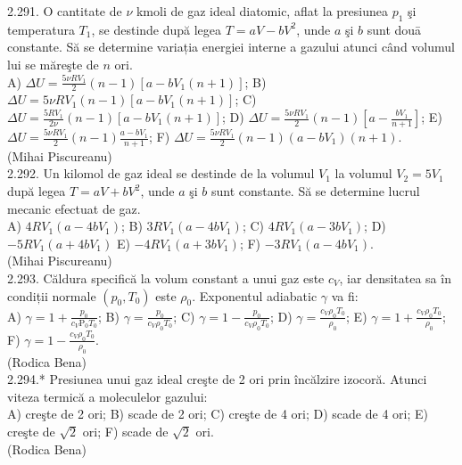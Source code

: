 2.291. O cantitate de $\nu$ kmoli de gaz ideal diatomic, aflat la presiunea $p_{1}$ şi temperatura $T_{1}$, se destinde după legea $T=a V-b V^{2}$, unde $a$ şi $b$ sunt douā constante. Să se determine variația energiei interne a gazului atunci când volumul lui se măreşte de $n$ ori.\\ A) $\Delta U=\frac{5 \nu R V_{1}}{2}(n-1)\left[a-b V_{1}(n+1)\right]$; B) $\Delta U=5 \nu R V_{1}(n-1)\left[a-b V_{1}(n+1)\right]$; C) $\Delta U=\frac{5 R V_{1}}{2 \nu}(n-1)\left[a-b V_{1}(n+1)\right]$; D) $\Delta U=\frac{5 \nu R V_{1}}{2}(n-1)\left[a-\frac{b V_{1}}{n+1}\right]$; E) $\Delta U=\frac{5 \nu R V_{1}}{2}(n-1) \frac{a-b V_{1}}{n+1}$; F) $\Delta U=\frac{5 \nu R V_{1}}{2}(n-1)\left(a-b V_{1}\right)(n+1)$.\\ (Mihai Piscureanu)\\

2.292. Un kilomol de gaz ideal se destinde de la volumul $V_{1}$ la volumul $V_{2}=5 V_{1}$ după legea $T=a V+b V^{2}$, unde $a$ şi $b$ sunt constante. Să se determine lucrul mecanic efectuat de gaz.\\ A) $4 R V_{1}\left(a-4 b V_{1}\right)$; B) $3 R V_{1}\left(a-4 b V_{1}\right)$; C) $4 R V_{1}\left(a-3 b V_{1}\right)$; D) $-5 R V_{1}\left(a+4 b V_{1}\right)$ E) $-4 R V_{1}\left(a+3 b V_{1}\right)$; F) $-3 R V_{1}\left(a-4 b V_{1}\right)$.\\ (Mihai Piscureanu)\\

2.293. Căldura specifică la volum constant a unui gaz este $c_{V}$, iar densitatea sa în condiții normale $\left(p_{0}, T_{0}\right)$ este $\rho_{0}$. Exponentul adiabatic $\gamma$ va fi:\\ A) $\gamma=1+\frac{p_{0}}{c_{V} \mathrm{P}_{0} T_{0}}$; B) $\gamma=\frac{p_{0}}{c_{V} \rho_{0} T_{0}}$; C) $\gamma=1-\frac{p_{0}}{c_{V} \rho_{0} T_{0}}$; D) $\gamma=\frac{c_{V} \rho_{0} T_{0}}{\rho_{0}}$; E) $\gamma=1+\frac{c_{V} \rho_{0} T_{0}}{\rho_{0}}$; F) $\gamma=1-\frac{c_{V} \rho_{0} T_{0}}{\rho_{0}}$.\\ (Rodica Bena)\\

2.294.* Presiunea unui gaz ideal creşte de 2 ori prin încălzire izocoră. Atunci viteza termică a moleculelor gazului:\\ A) creşte de 2 ori; B) scade de 2 ori; C) creşte de 4 ori; D) scade de 4 ori; E) creşte de $\sqrt{2}$ ori; F) scade de $\sqrt{2}$ ori.\\ (Rodica Bena)\\

